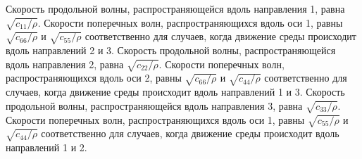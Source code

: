 \documentclass[thesis.tex]{subfiles}
\begin{document}
Скорость продольной волны, распространяющейся вдоль направления 1, равна $\sqrt{c_{11}/\rho}$. Скорости поперечных волн,
распространяющихся вдоль оси 1, равны $\sqrt{c_{66}/\rho}$ и $\sqrt{c_{55}/\rho}$ соответственно для случаев, когда
движение среды происходит вдоль направлений 2 и 3. Скорость продольной волны, распространяющейся вдоль направления 2,
равна $\sqrt{c_{22}/\rho}$. Скорости поперечных волн, распространяющихся вдоль оси 2, равны $\sqrt{c_{66}/\rho}$ и
$\sqrt{c_{44}/\rho}$ соответственно для случаев, когда движение среды происходит вдоль направлений 1 и 3. Скорость
продольной волны, распространяющейся вдоль направления 3, равна $\sqrt{c_{33}/\rho}$. Скорости поперечных волн,
распространяющихся вдоль оси 1, равны $\sqrt{c_{55}/\rho}$ и $\sqrt{c_{44}/\rho}$ соответственно для случаев, когда
движение среды происходит вдоль направлений 1 и 2.
\end{document}
